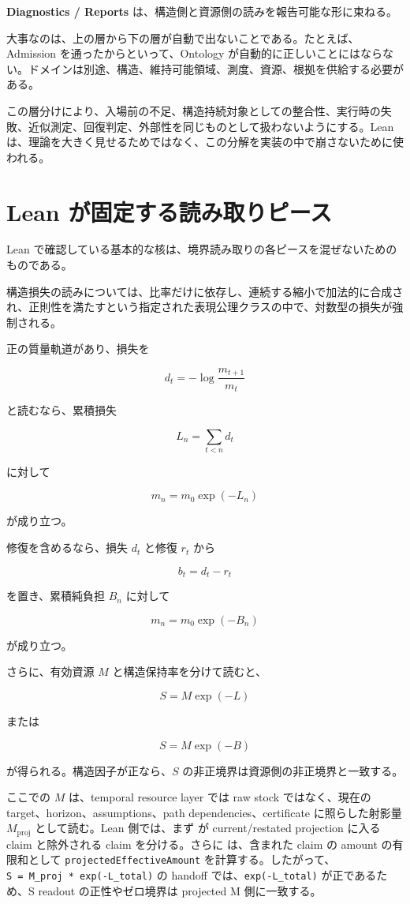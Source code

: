 \documentclass[12pt,a4paper]{article}
\begin{document}
\textbf{Diagnostics / Reports} は、構造側と資源側の読みを報告可能な形に束ねる。

大事なのは、上の層から下の層が自動で出ないことである。たとえば、Admission を通ったからといって、Ontology が自動的に正しいことにはならない。ドメインは別途、構造、維持可能領域、測度、資源、根拠を供給する必要がある。

この層分けにより、入場前の不足、構造持続対象としての整合性、実行時の失敗、近似測定、回復判定、外部性を同じものとして扱わないようにする。Lean は、理論を大きく見せるためではなく、この分解を実装の中で崩さないために使われる。

\section{Lean が固定する読み取りピース}\label{lean-ux304cux56faux5b9aux3059ux308bux8aadux307fux53d6ux308aux30d4ux30fcux30b9}

Lean で確認している基本的な核は、境界読み取りの各ピースを混ぜないためのものである。

構造損失の読みについては、比率だけに依存し、連続する縮小で加法的に合成され、正則性を満たすという指定された表現公理クラスの中で、対数型の損失が強制される。

正の質量軌道があり、損失を

\[
d_t=-\log\frac{m_{t+1}}{m_t}
\]

と読むなら、累積損失

\[
L_n=\sum_{t<n}d_t
\]

に対して

\[
m_n=m_0\exp(-L_n)
\]

が成り立つ。

修復を含めるなら、損失 \(d_t\) と修復 \(r_t\) から

\[
b_t=d_t-r_t
\]

を置き、累積純負担 \(B_n\) に対して

\[
m_n=m_0\exp(-B_n)
\]

が成り立つ。

さらに、有効資源 \(M\) と構造保持率を分けて読むと、

\[
S=M\exp(-L)
\]

または

\[
S=M\exp(-B)
\]

が得られる。構造因子が正なら、\(S\) の非正境界は資源側の非正境界と一致する。

ここでの \(M\) は、temporal resource layer では raw stock ではなく、現在の target、horizon、assumptions、path dependencies、certificate に照らした射影量 \(M_{\mathrm{proj}}\) として読む。Lean 側では、まず {\scriptsize{}} が current/restated projection に入る claim と除外される claim を分ける。さらに {\scriptsize{}} は、含まれた claim の amount の有限和として \texttt{projectedEffectiveAmount} を計算する。したがって、\texttt{S\ =\ M\_proj\ *\ exp(-L\_total)} の handoff では、\texttt{exp(-L\_total)} が正であるため、S readout の正性やゼロ境界は projected M 側に一致する。
\end{document}
